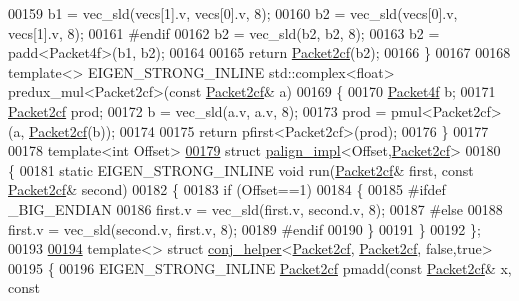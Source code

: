 \begin{DoxyCode}
00159   b1 = vec\_sld(vecs[1].v, vecs[0].v, 8);
00160   b2 = vec\_sld(vecs[0].v, vecs[1].v, 8);
00161 \textcolor{preprocessor}{#endif}
00162   b2 = vec\_sld(b2, b2, 8);
00163   b2 = padd<Packet4f>(b1, b2);
00164 
00165   \textcolor{keywordflow}{return} \hyperlink{struct_eigen_1_1internal_1_1_packet2cf}{Packet2cf}(b2);
00166 \}
00167 
00168 \textcolor{keyword}{template}<> EIGEN\_STRONG\_INLINE std::complex<float> predux\_mul<Packet2cf>(\textcolor{keyword}{const} 
      \hyperlink{struct_eigen_1_1internal_1_1_packet2cf}{Packet2cf}& a)
00169 \{
00170   \hyperlink{struct_eigen_1_1internal_1_1_packet4f}{Packet4f} b;
00171   \hyperlink{struct_eigen_1_1internal_1_1_packet2cf}{Packet2cf} prod;
00172   b = vec\_sld(a.v, a.v, 8);
00173   prod = pmul<Packet2cf>(a, \hyperlink{struct_eigen_1_1internal_1_1_packet2cf}{Packet2cf}(b));
00174 
00175   \textcolor{keywordflow}{return} pfirst<Packet2cf>(prod);
00176 \}
00177 
00178 \textcolor{keyword}{template}<\textcolor{keywordtype}{int} Offset>
\hyperlink{struct_eigen_1_1internal_1_1palign__impl_3_01_offset_00_01_packet2cf_01_4}{00179} \textcolor{keyword}{struct }\hyperlink{struct_eigen_1_1internal_1_1palign__impl}{palign\_impl}<Offset,\hyperlink{struct_eigen_1_1internal_1_1_packet2cf}{Packet2cf}>
00180 \{
00181   \textcolor{keyword}{static} EIGEN\_STRONG\_INLINE \textcolor{keywordtype}{void} run(\hyperlink{struct_eigen_1_1internal_1_1_packet2cf}{Packet2cf}& first, \textcolor{keyword}{const} \hyperlink{struct_eigen_1_1internal_1_1_packet2cf}{Packet2cf}& second)
00182   \{
00183     \textcolor{keywordflow}{if} (Offset==1)
00184     \{
00185 \textcolor{preprocessor}{#ifdef \_BIG\_ENDIAN}
00186       first.v = vec\_sld(first.v, second.v, 8);
00187 \textcolor{preprocessor}{#else}
00188       first.v = vec\_sld(second.v, first.v, 8);
00189 \textcolor{preprocessor}{#endif}
00190     \}
00191   \}
00192 \};
00193 
\hyperlink{struct_eigen_1_1internal_1_1conj__helper_3_01_packet2cf_00_01_packet2cf_00_01false_00_01true_01_4}{00194} \textcolor{keyword}{template}<> \textcolor{keyword}{struct }\hyperlink{struct_eigen_1_1internal_1_1conj__helper}{conj\_helper}<\hyperlink{struct_eigen_1_1internal_1_1_packet2cf}{Packet2cf}, \hyperlink{struct_eigen_1_1internal_1_1_packet2cf}{Packet2cf}, false,true>
00195 \{
00196   EIGEN\_STRONG\_INLINE \hyperlink{struct_eigen_1_1internal_1_1_packet2cf}{Packet2cf} pmadd(\textcolor{keyword}{const} \hyperlink{struct_eigen_1_1internal_1_1_packet2cf}{Packet2cf}& x, \textcolor{keyword}{const} 

\end{DoxyCode}
